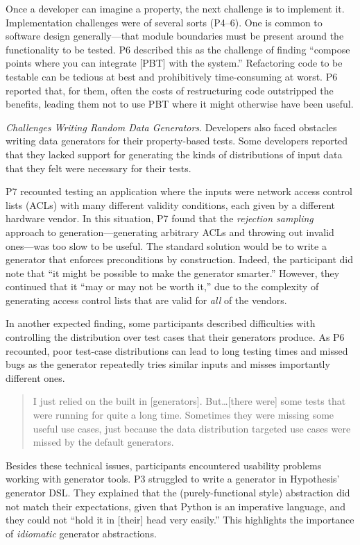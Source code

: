 Once a developer can imagine a property, the next challenge is to implement it.
Implementation challenges were of several sorts (P4--6). One
is common to software design generally---that module boundaries must be present
around the functionality to be tested. P6 described this as the challenge of
finding ``compose points where you can integrate [PBT] with the system.'' Refactoring
code to be testable can be tedious at best and prohibitively time-consuming at
worst. P6 reported that, for them, often the costs of restructuring code outstripped the benefits,
leading them not to use PBT where it might otherwise have been useful.

\textit{Challenges Writing Random Data Generators}.
Developers also faced obstacles writing data generators for their property-based 
tests.
Some developers reported that they lacked support for generating the kinds of
distributions of input data that they felt were necessary for their tests.

P7 recounted testing an application where the inputs were network access control lists (ACLs)
with many different validity conditions, each given by
a different hardware vendor.
In this situation, P7 found that the {\em rejection sampling} approach to generation---generating
arbitrary ACLs and throwing out invalid ones---was too slow to be useful.
The standard solution would be to write a generator that enforces preconditions
by construction. Indeed, the participant did note that ``it might be possible to
make the generator smarter.'' However, they continued that it ``may or may not be worth it,'' due to
the complexity of generating access control lists that are valid for \emph{all}
of the vendors.

In another expected finding, some participants described difficulties with
controlling the distribution over test cases that their generators produce.
As P6 recounted, poor test-case distributions can lead to long testing times and missed bugs
as the generator repeatedly tries similar inputs and misses importantly different ones.
\begin{quote}
  I just relied on the built in [generators]. But\dots [there were] some tests
  that were running for quite a long time. Sometimes they were missing some
  useful use cases, just because the data distribution targeted use cases were
  missed by the default generators.
\end{quote}

Besides these technical issues,
participants encountered usability problems working with generator tools. P3 struggled to
write a generator in Hypothesis' generator DSL. They
explained that the (purely-functional style) abstraction did not match their expectations, given that Python is an imperative language, and they could
not ``hold it in [their] head very easily.'' This highlights the importance of
{\em idiomatic} generator abstractions.

